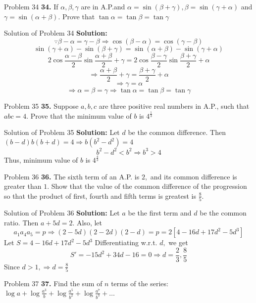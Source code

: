 \documentclass[aspectratio=1610,8pt]{beamer}
\begin{document}
\begin{frame}{Problem 34}
  \textbf{34.} If $\alpha, \beta, \gamma$ are in A.P.and $\alpha = \sin(\beta + \gamma), \beta = \sin(\gamma + \alpha)$ and $\gamma
  = \sin(\alpha + \beta).$ Prove that $\tan \alpha = \tan \beta = \tan \gamma$
\end{frame}
\begin{frame}{Solution of Problem 34}
  \textbf{Solution:} $$\because \beta - \alpha = \gamma - \beta \Rightarrow \cos(\beta - \alpha) = \cos(\gamma - \beta)$$
  $$\sin(\gamma + \alpha) - \sin(\beta + \gamma) = \sin(\alpha + \beta) - \sin(\gamma + \alpha)$$
  $$2\cos\frac{\alpha - \beta}{2}\sin\frac{\alpha + \beta}{2} + \gamma = 2\cos \frac{\beta - \gamma}{2}\sin\frac{\beta + \gamma}{2}
  + \alpha$$
  $$\Rightarrow \frac{\alpha + \beta}{2} + \gamma = \frac{\beta + \gamma}{2} + \alpha$$
  $$\Rightarrow \gamma = \alpha$$
  $$\Rightarrow \alpha = \beta = \gamma \Rightarrow \tan\alpha = \tan\beta = \tan\gamma$$
\end{frame}
\begin{frame}{Problem 35}
  \textbf{35.} Suppose $a, b, c$ are three positive real numbers in A.P., such that $abc = 4.$ Prove that the minimum value of $b$
  is $4^{\frac{1}{3}}$
\end{frame}
\begin{frame}{Solution of Problem 35}
  \textbf{Solution:} Let $d$ be the common difference. Then $(b - d)b(b + d) = 4 \Rightarrow b(b^2 - d^2) = 4$
  $$b^2 - d^2 < b^2 \Rightarrow b^3 > 4$$
  Thus, minimum value of $b$ is $4^{\frac{4}{3}}$
\end{frame}
\begin{frame}{Problem 36}
  \textbf{36.} The sixth term of an A.P. is $2,$ and its common difference is greater than $1.$ Show that the value of the common
  difference of the progression so that the product of first, fourth and fifth terms is greatest is $\frac{8}{5}.$
\end{frame}
\begin{frame}{Solution of Problem 36}
  \textbf{Solution:} Let $a$ be the first term and $d$ be the common ratio. Then $a + 5d = 2.$ Also, let
  $$a_1a_4a_5 = p \Rightarrow (2 - 5d)(2 - 2d)(2 - d) = p = 2[4 - 16d + 17d^2 - 5d^3]$$
  Let $S = 4 - 16d + 17d^2 - 5d^3$
  Differentiating w.r.t. $d,$ we get
  $$S' = -15d^2 + 34 d - 16 = 0 \Rightarrow d = \frac{2}{3}, \frac{8}{5}$$
  Since $d > 1, \Rightarrow d = \frac{8}{5}$
\end{frame}
\begin{frame}{Problem 37}
  \textbf{37.} Find the sum of $n$ terms of the series: $\log a + \log\frac{a^3}{b} + \log \frac{a^5}{b^2} + \log \frac{a^7}{b^3} +
  \ldots$
\end{frame}
\end{document}
